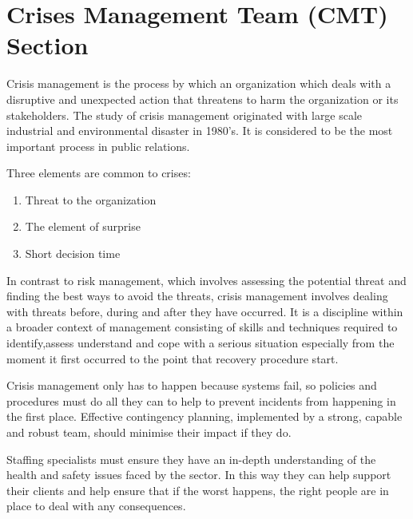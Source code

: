 \chapter{Crises Management Team (CMT) Section}

Crisis management is the process by which an organization which
deals with a disruptive and unexpected action that threatens to harm
the organization or its stakeholders. The study of crisis management
originated with large scale industrial and environmental disaster in
1980’s. It is considered to be the most important process in public
relations.

\vspace{1em}


\noindent Three elements are common to crises:

\begin{enumerate}

\item Threat to the organization

\item The element of surprise

\item Short decision time

\end{enumerate}


\vspace{1em}

In contrast to risk management, which involves assessing the
potential threat and finding the best ways to avoid the threats, crisis
management involves dealing with threats before, during and after
they have occurred. It is a discipline within a broader context of
management consisting of skills and techniques required to identify,assess understand and cope with a serious situation especially from
the moment it first occurred to the point that recovery procedure start.

\vspace{1em}

Crisis management only has to happen because systems fail, so policies and procedures must do all 
they can to help to prevent incidents from happening in the first place. Effective contingency planning,
implemented by a strong, capable and robust team, should minimise their impact if they do.

\vspace{2em}

Staffing specialists must ensure they have an in-depth understanding of the health and 
safety issues faced by the sector. In this way they can help support their clients and 
help ensure that if the worst happens, the right people are in place to deal with any consequences.

